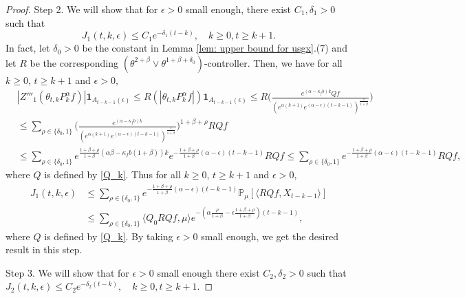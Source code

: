 \documentclass[12pt,a4paper]{amsart}
\theoremstyle{plain}
\theoremstyle{definition}
\numberwithin{equation}{section}
\begin{document}
\begin{proof}
Step 2. We will show that for $\epsilon>0$ small enough, there exist  $C_1, \delta_1>0$ such that
\begin{equation}
\label{lemma31q}
    J_1(t,k,\epsilon)
    \leq C_1e^{-\delta_1 (t-k)},
    \quad k\geq 0, t\geq k+1.
\end{equation}
    In fact, let $\delta_0 >0$ be the constant in Lemma \ref{lem: upper bound for usgx}.(7) and let $R$ be the corresponding $(\theta^{2+\beta}\vee \theta^{1+\beta+\delta_0})$-controller.
    Then, we have for all $k\geq 0$, $t\geq k+1$ and $\epsilon> 0$,
\begin{align}
    & |Z'''_1(\theta_{t,k}P^\alpha_k f)|\mathbf{1}_{A_{t-k-1}(\epsilon)}
    \leq R(|\theta_{t,k}P^\alpha_k f|)\mathbf{1}_{A_{t-k-1}(\epsilon)}
    \leq R \Big(\frac{e^{(\alpha-\kappa_fb)k} Qf}{(e^{\alpha (k+1)}e^{(\alpha-\epsilon)(t-k-1)})^\frac{1}{1+\beta}}\Big)
    \\&\leq \sum_{\rho \in \{\delta_0, 1\}}\Big(\frac{e^{(\alpha-\kappa_fb)k}}{(e^{\alpha (k+1)}e^{(\alpha-\epsilon)(t-k-1)})^\frac{1}{1+\beta}}\Big)^{1+\beta+ \rho} RQf
    \\&\leq\sum_{\rho \in \{\delta_0, 1\}}e^{\frac{1+\beta + \rho}{1+\beta}(\alpha\beta-\kappa_fb(1+\beta))k}e^{-\frac{1+\beta+\rho}{1+\beta} (\alpha-\epsilon)(t-k-1)}RQf
    \leq \sum_{\rho \in \{\delta_0,1\}}e^{-\frac{1+\beta+\rho}{1+\beta}(\alpha-\epsilon)(t-k-1)}RQf,
\end{align}
    where $Q$ is defined by \eqref{Q_k}.
    Thus for all $k\geq 0$, $t\geq k+1$ and $\epsilon> 0$,
\begin{align}
\label{eq: estimate of J1}
    J_1(t,k,\epsilon)&
    \leq \sum_{\rho \in \{\delta_0,1\}}e^{-\frac{1+\beta+\rho}{1+\beta}(\alpha-\epsilon)(t-k-1)}\mathbb{P}_{\mu}[\langle RQf,X_{t-k-1}\rangle]\\
    & \leq \sum_{\rho \in \{\delta_0,1\}} \langle Q_0 RQf, \mu \rangle e^{-(\alpha\frac{\rho}{1+\beta}-\epsilon\frac{1+\beta+\rho}{1+\beta})(t-k-1)},
\end{align}
    where $Q$ is defined by \eqref{Q_k}.
    By taking $\epsilon>0$ small enough, we get the desired result in this step.

    Step 3.
    We will show that for $\epsilon>0$ small enough there exist $C_2, \delta_2>0$ such that
$
    J_2(t,k,\epsilon)
    \leq C_2e^{-\delta_2 (t-k)},
    \quad k\geq 0, t\geq k+1.
$


\end{proof}
\end{document}
